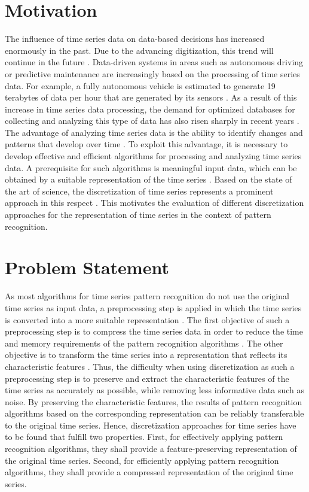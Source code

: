 \section{Motivation}
The influence of time series data on data-based decisions has increased enormously in the past. Due to the advancing digitization, this trend will continue in the future \cite{Forbes}. Data-driven systems in areas such as autonomous driving or predictive maintenance are increasingly based on the processing of time series data. For example, a fully autonomous vehicle is estimated to generate 19 terabytes of data per hour that are generated by its sensors \cite{Sensor_Data}. As a result of this increase in time series data processing, the demand for optimized databases for collecting and analyzing this type of data has also risen sharply in recent years \cite{TS_Databases}. \newline
The advantage of analyzing time series data is the ability to identify changes and patterns that develop over time \cite{Survey_Esling}. To exploit this advantage, it is necessary to develop effective and efficient algorithms for processing and analyzing time series data. A prerequisite for such algorithms is meaningful input data, which can be obtained by a suitable representation of the time series \cite{Survey_Esling}. Based on the state of the art of science, the discretization of time series represents a prominent approach in this respect \cite{Survey_Esling}. This motivates the evaluation of different discretization approaches for the representation of time series in the context of pattern recognition.
\section{Problem Statement}
As most algorithms for time series pattern recognition do not use the original time series as input data, a preprocessing step is applied in which the time series is converted into a more suitable representation \cite{Survey_Esling}. The first objective of such a preprocessing step is to compress the time series data in order to reduce the time and memory requirements of the pattern recognition algorithms \cite{Survey_Esling}. The other objective is to transform the time series into a representation that reflects its characteristic features \cite{Survey_Esling}. \newline
Thus, the difficulty when using discretization as such a preprocessing step is to preserve and extract the characteristic features of the time series as accurately as possible, while removing less informative data such as noise. By preserving the characteristic features, the results of pattern recognition algorithms based on the corresponding representation can be reliably transferable to the original time series. Hence, discretization approaches for time series have to be found that fulfill two properties. First, for effectively applying pattern recognition algorithms, they shall provide a feature-preserving representation of the original time series. Second, for efficiently applying pattern recognition algorithms, they shall provide a compressed representation of the original time series.

